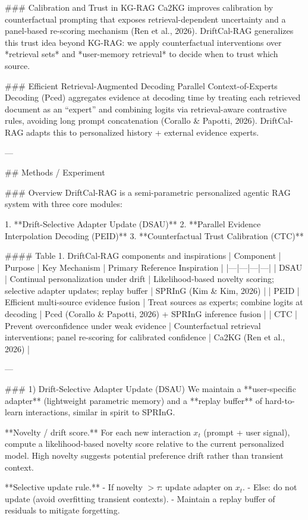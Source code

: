 ### Calibration and Trust in KG-RAG  
Ca2KG improves calibration by counterfactual prompting that exposes retrieval-dependent uncertainty and a panel-based re-scoring mechanism (Ren et al., 2026). DriftCal-RAG generalizes this trust idea beyond KG-RAG: we apply counterfactual interventions over *retrieval sets* and *user-memory retrieval* to decide when to trust which source.

### Efficient Retrieval-Augmented Decoding  
Parallel Context-of-Experts Decoding (Pced) aggregates evidence at decoding time by treating each retrieved document as an “expert” and combining logits via retrieval-aware contrastive rules, avoiding long prompt concatenation (Corallo & Papotti, 2026). DriftCal-RAG adapts this to personalized history + external evidence experts.

---

## Methods / Experiment  

### Overview  
DriftCal-RAG is a semi-parametric personalized agentic RAG system with three core modules:

1. **Drift-Selective Adapter Update (DSAU)**  
2. **Parallel Evidence Interpolation Decoding (PEID)**  
3. **Counterfactual Trust Calibration (CTC)**  

#### Table 1. DriftCal-RAG components and inspirations  
| Component | Purpose | Key Mechanism | Primary Reference Inspiration |
|---|---|---|---|
| DSAU | Continual personalization under drift | Likelihood-based novelty scoring; selective adapter updates; replay buffer | SPRInG (Kim & Kim, 2026) |
| PEID | Efficient multi-source evidence fusion | Treat sources as experts; combine logits at decoding | Pced (Corallo & Papotti, 2026) + SPRInG inference fusion |
| CTC | Prevent overconfidence under weak evidence | Counterfactual retrieval interventions; panel re-scoring for calibrated confidence | Ca2KG (Ren et al., 2026) |

---

### 1) Drift-Selective Adapter Update (DSAU)  
We maintain a **user-specific adapter** (lightweight parametric memory) and a **replay buffer** of hard-to-learn interactions, similar in spirit to SPRInG.

**Novelty / drift score.** For each new interaction \(x_t\) (prompt + user signal), compute a likelihood-based novelty score relative to the current personalized model. High novelty suggests potential preference drift rather than transient context.

**Selective update rule.**  
- If novelty \(>\tau\): update adapter on \(x_t\).  
- Else: do not update (avoid overfitting transient contexts).  
- Maintain a replay buffer of residuals to mitigate forgetting.

